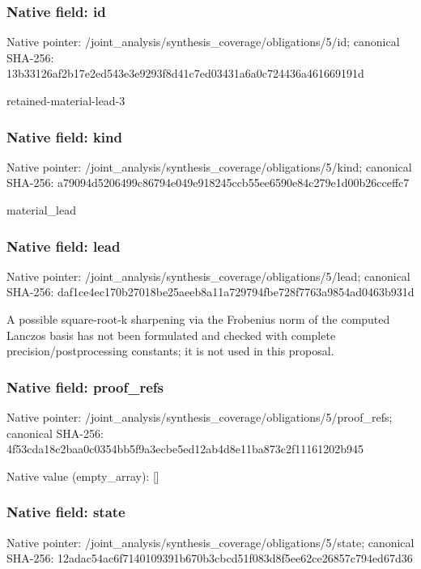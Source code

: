 \documentclass[10pt,a4paper]{article}
\begin{document}
\subsubsection{Native field: id}
Native pointer: /joint\_\allowbreak{}analysis/synthesis\_\allowbreak{}coverage/obligations/5/id; canonical SHA-256: 13b33126af2b17e2ed543e3e9293f8d41c7ed03431a6a0c724436a461669191d

\begingroup\raggedright\sloppy retained-material-lead-3\par\endgroup

\subsubsection{Native field: kind}
Native pointer: /joint\_\allowbreak{}analysis/synthesis\_\allowbreak{}coverage/obligations/5/kind; canonical SHA-256: a79094d5206499c86794e049e918245ccb55ee6590e84c279e1d00b26cceffc7

\begingroup\raggedright\sloppy material\_\allowbreak{}lead\par\endgroup

\subsubsection{Native field: lead}
Native pointer: /joint\_\allowbreak{}analysis/synthesis\_\allowbreak{}coverage/obligations/5/lead; canonical SHA-256: daf1ce4ec170b27018be25aeeb8a11a729794fbe728f7763a9854ad0463b931d

\begingroup\raggedright\sloppy A possible square-root-k sharpening via the Frobenius norm of the computed Lanczos basis has not been formulated and checked with complete precision/\allowbreak{}postprocessing constants;\allowbreak{} it is not used in this proposal.\par\endgroup

\subsubsection{Native field: proof\_\allowbreak{}refs}
Native pointer: /joint\_\allowbreak{}analysis/synthesis\_\allowbreak{}coverage/obligations/5/proof\_\allowbreak{}refs; canonical SHA-256: 4f53cda18c2baa0c0354bb5f9a3ecbe5ed12ab4d8e11ba873c2f11161202b945

Native value (empty\_\allowbreak{}array): []

\subsubsection{Native field: state}
Native pointer: /joint\_\allowbreak{}analysis/synthesis\_\allowbreak{}coverage/obligations/5/state; canonical SHA-256: 12adac54ac6f7140109391b670b3cbcd51f083d8f5ee62ce26857c794ed67d36
\end{document}
